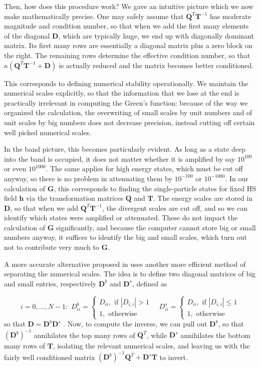 Then, how does this procedure work?
We gave an intuitive picture which we now make mathematically precise.
One may safely assume that $\bm Q^T \bm T^{-1}$ has moderate magnitude and condition number, so that when we add the first many elements of the diagonal $\bm D$, which are typically huge, we end up with diagonally dominant matrix.
Its first many rows are essentially a diagonal matrix plus a zero block on the right.
The remaining rows determine the effective condition number, so that $\kappa ( \bm Q^T \bm T^{-1} + \bm D )$ is actually reduced and the matrix becomes better conditioned.

This corresponds to defining numerical stability operationally.
We maintain the numerical scales explicitly, so that the information that we lose at the end is practically irrelevant in computing the Green's function: because of the way we organized the calculation, the overwriting of small scales by unit numbers and of unit scales by big numbers does not decrease precision, instead cutting off certain well picked numerical scales.

In the band picture, this becomes particularly evident.
As long as a state deep into the band is occupied, it does not matter whether it is amplified by say $10^{100}$ or even $10^{1000}$.
The same applies for high energy states, which must be cut off anyway, so there is no problem in attenuating them by $10^{-100}$ or $10^{-1000}$.
In our calculation of $\bm G$, this corresponds to finding the single-particle states for fixed HS field $\bm h$ via the transformation matrices $\bm Q$ and $\bm T$.
The energy scales are stored in $\bm D$, so that when we add $\bm Q^T \bm T^{-1}$, the divergent scales are cut off, and so we can identify which states were amplified or attenuated.
These do not impact the calculation of $\bm G$ significantly, and because the computer cannot store big or small numbers anyway, it suffices to identify the big and small scales, which turn out not to contribute very much to $\bm G$.

A more accurate alternative proposed in \cite{bai_stable_2011} uses another more efficient method of separating the numerical scales.
The idea is to define two diagonal matrices of big and small entries, respectively $\bm D^b$ and $\bm D^s$, defined as

\begin{equation}
i = 0,..., N-1 :\,\,
D_{i i}^b =
\begin{cases}
D_{i i} , \,\, \text{if} \,\, | D_{i, i} | > 1 \\
1 , \,\, \text{otherwise}
\end{cases}
\quad
D_{i i}^s =
\begin{cases}
D_{i i} , \,\, \text{if} \,\, | D_{i, i} | \le 1 \\
1 , \,\, \text{otherwise}
\end{cases}
\end{equation}
so that $\bm D = \bm D^b \bm D^s$ .
Now, to compute the inverse, we can pull out $\bm D^b$, so that $(\bm D^b)^{-1}$ annihilates the top many rows of $\bm Q^T$, while $\bm D^s$ annihilates the bottom many rows of $\bm T$, isolating the relevant numerical scales, and leaving us with the fairly well conditioned matrix $(\bm D^b)^{-1} \bm Q^T + \bm D^s \bm T$ to invert.

